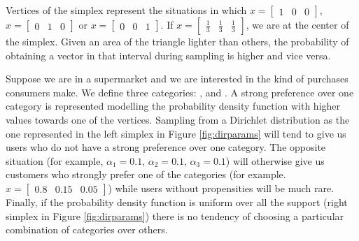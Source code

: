 Vertices of the simplex represent the situations in which $x = \begin{bmatrix}1 & 0 & 0 \end{bmatrix}$, $x = \begin{bmatrix}0 & 1 & 0 \end{bmatrix}$ or $x = \begin{bmatrix}0 & 0 & 1 \end{bmatrix}$.
If $x = \begin{bmatrix}\frac{1}{3} & \frac{1}{3} & \frac{1}{3} \end{bmatrix}$, we are at the center of the simplex.
Given an area of the triangle lighter than others, the probability of obtaining a vector in that interval during sampling is higher and vice versa.

Suppose we are in a supermarket and we are interested in the kind of purchases consumers make.
We define three categories: ,  and .
A strong preference over one category is represented modelling the probability density function with higher values towards one of the vertices.
Sampling from a Dirichlet distribution as the one represented in the left simplex in Figure \ref{fig:dirparams} will tend to give us users who do not have a strong preference over one category.
The opposite situation (for example, $\alpha_1=0.1, \, \alpha_2=0.1, \, \alpha_3=0.1$) will otherwise give us customers who strongly prefer one of the categories (for example. $x = \begin{bmatrix}0.8 & 0.15 & 0.05 \end{bmatrix}$) while users without propensities will be much rare.
Finally, if the probability density function is uniform over all the support (right simplex in Figure \ref{fig:dirparams}) there is no tendency of choosing a particular combination of categories over others.

